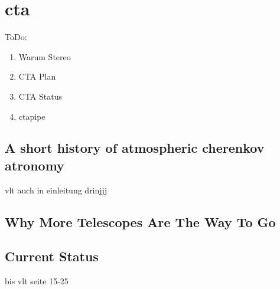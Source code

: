 \chapter{cta}\label{cta}

ToDo:
\begin{enumerate}
    \item Warum Stereo
    \item CTA Plan
    \item CTA Status
    \item ctapipe
\end{enumerate}

\section{A short history of atmospheric cherenkov atronomy}
vlt auch in einleitung drinjjj

\section{Why More Telescopes Are The Way To Go}
\section{Current Status}


bis vlt seite 15-25
